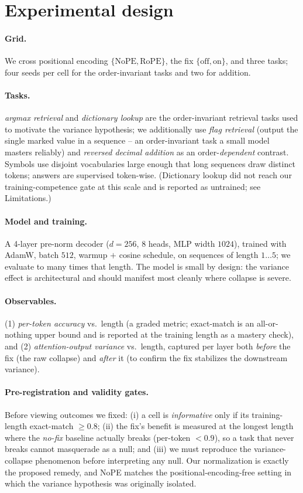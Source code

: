 \documentclass[11pt]{article}
\begin{document}
\section{Experimental design}
\paragraph{Grid.} We cross positional encoding $\{\text{NoPE},\text{RoPE}\}$, the fix
$\{\text{off},\text{on}\}$, and three tasks; four seeds per cell for the order-invariant tasks and two
for addition.

\paragraph{Tasks.} \emph{argmax retrieval} and \emph{dictionary lookup} are the order-invariant
retrieval tasks used to motivate the variance hypothesis; we additionally use \emph{flag retrieval}
(output the single marked value in a sequence -- an order-invariant task a small model masters reliably)
and \emph{reversed decimal addition} as an order-\emph{dependent} contrast. Symbols use disjoint
vocabularies large enough that long sequences draw distinct tokens; answers are supervised token-wise.
(Dictionary lookup did not reach our training-competence gate at this scale and is reported as untrained;
see Limitations.)

\paragraph{Model and training.} A 4-layer pre-norm decoder ($d{=}256$, 8 heads, MLP width $1024$),
trained with AdamW, batch $512$, warmup $+$ cosine schedule, on sequences of length $1\ldots 5$; we
evaluate to many times that length. The model is small by design: the variance effect is architectural
and should manifest most cleanly where collapse is severe.

\paragraph{Observables.} (1) \emph{per-token accuracy} vs.\ length (a graded metric; exact-match is an
all-or-nothing upper bound and is reported at the training length as a mastery check), and (2)
\emph{attention-output variance} vs.\ length, captured per layer both \emph{before} the fix (the raw
collapse) and \emph{after} it (to confirm the fix stabilizes the downstream variance).

\paragraph{Pre-registration and validity gates.} Before viewing outcomes we fixed: (i) a cell is
\emph{informative} only if its training-length exact-match $\ge 0.8$; (ii) the fix's benefit is measured
at the longest length where the \emph{no-fix} baseline actually breaks (per-token $<0.9$), so a task that
never breaks cannot masquerade as a null; and (iii) we must reproduce the variance-collapse phenomenon
before interpreting any null. Our normalization is exactly the proposed remedy, and NoPE matches the
positional-encoding-free setting in which the variance hypothesis was originally isolated.
\end{document}
